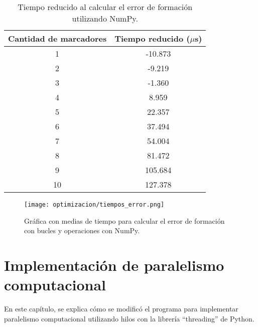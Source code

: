 \begin{table}[H]
	\centering
	\resizebox{0.5\textwidth}{!} {
	\begin{tabular}{|c|c|}
		\hline
		\textbf{Cantidad de marcadores} & \textbf{Tiempo reducido ($\mu$s)} \\ \hline
		1                               & -10.873                       \\ \hline
		2                               & -9.219                        \\ \hline
		3                               & -1.360                        \\ \hline
		4                               & 8.959                         \\ \hline
		5                               & 22.357                        \\ \hline
		6                               & 37.494                        \\ \hline
		7                               & 54.004                        \\ \hline
		8                               & 81.472                        \\ \hline
		9                               & 105.684                       \\ \hline
		10                              & 127.378                       \\ \hline
	\end{tabular}}
	\caption{Tiempo reducido al calcular el error de formación utilizando NumPy.}
	\label{cuadro:tiempo_reducido_error}
\end{table}

\begin{figure}[H]
	\centering
	\texttt{[image: optimizacion/tiempos\_error.png]}
	\caption{Gráfica con medias de tiempo para calcular el error de formación con bucles y operaciones con NumPy.}
	\label{fig:grafica_tiempos_error}
\end{figure}

\section{Implementación de paralelismo computacional}
En este capítulo, se explica cómo se modificó el programa para implementar paralelismo computacional utilizando hilos con la librería ``threading'' de Python.


